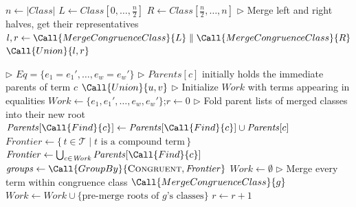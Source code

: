 \begin{algorithm}
\begin{algorithmic}[1]
      \State {}  \EndIf \State $n \gets |\textit{Class}|$ \State $L \gets
      \mathit{Class}[0,\ldots,\frac{n}{2}]$ \State $R \gets
      \mathit{Class}[\frac{n}{2},\ldots,n]$ \State $\rhd$ Merge left and right
      halves, get their representatives \State $l, r \gets
      \Call{MergeCongruenceClass}{L} \parallel \Call{MergeCongruenceClass}{R}$
      \State \Return $\Call{Union}{l, r}$  \EndFunction

        \State $\rhd$ $\mathit{Eq} = \{e_1 = e_1', \ldots, e_w = e_w'\}$
        \State $\rhd$ $\mathit{Parents}[c]$ initially holds the immediate parents of term $c$
          \State $\Call{Union}{u, v}$
        \EndParFor
        \State $\rhd$ Initialize $\mathit{Work}$ with terms appearing in equalities
        \State $\mathit{Work} \gets \{e_1, e_1', \ldots, e_w, e_w'\}$;\quad $r \gets 0$
          \State $\rhd$ Fold parent lists of merged classes into their new root
           
            \State $\mathit{Parents}[\Call{Find}{c}] \gets \mathit{Parents}[\Call{Find}{c}] \cup \mathit{Parents}[c]$
          \EndParFor
           
            \State $\mathit{Frontier} \gets \{\, t \in \mathcal{T} \mid t \text{ is a compound term} \,\}$
          \Else
            \State $\mathit{Frontier} \gets \bigcup_{c \in \mathit{Work}} \mathit{Parents}[\Call{Find}{c}]$
          \EndIf
          \State $\mathit{groups} \gets \Call{GroupBy}{\textsc{Congruent}, \mathit{Frontier}}$
          \State $\mathit{Work} \gets \emptyset$
            \State $\rhd$ Merge every term within congruence class
            \State $\Call{MergeCongruenceClass}{g}$
            \State \mbox{$\mathit{Work} \gets \mathit{Work} \cup \{\text{pre-merge roots of } g\text{'s classes}\}$}
          \EndParFor
          \State $r \gets r + 1$
        \EndWhile
    \EndFunction
\end{algorithmic}
\caption{\parentalgo: parents-based bulk-synchronous algorithm}
\label{alg:bsp}
\end{algorithm}

